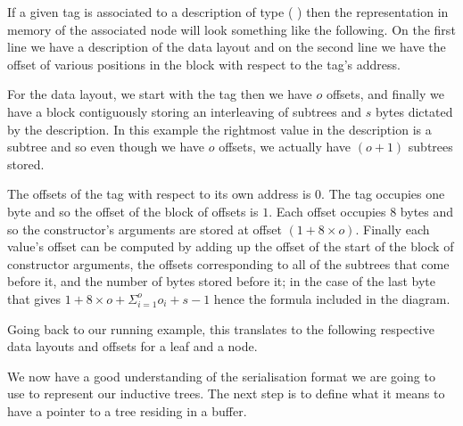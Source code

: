 If a given tag is associated to a description of type
(   )
then the representation in memory of the associated node will look something
like the following.
%
On the first line we have a description of the data layout and on the
second line we have the offset of various positions in the block with
respect to the tag's address.

\label{fig:data-layout}
\begin{center}

\end{center}


For the data layout,
we start with the tag
then we have $o$ offsets,
and finally we have a block contiguously storing an interleaving of
subtrees and $s$ bytes
dictated by the description.
%
In this example the rightmost value in the description is a subtree and
so even though we have $o$ offsets, we actually have $(o+1)$ subtrees stored.

The offsets of the tag with respect to its own address is $0$.
The tag occupies one byte and so the offset of the block of offsets is $1$.
Each offset occupies 8 bytes and so the constructor's arguments
are stored at offset $(1+8\times{}o)$.
Finally each value's offset can be computed by adding up
the offset of the start of the block of constructor arguments,
the offsets corresponding to all of the subtrees that come before it,
and the number of bytes stored before it;
in the case of the last byte that gives $1+8\times{}o + \Sigma_{i=1}^{o}o_i + s-1$
hence the formula included in the diagram.

Going back to our running example, this translates to the following
respective data layouts and offsets for a leaf and a node.

\begin{center}
  
\end{center}


We now have a good understanding of the serialisation format we
are going to use to represent our inductive trees.
%
The next step is to define what it means to have a pointer to a
tree residing in a buffer.
